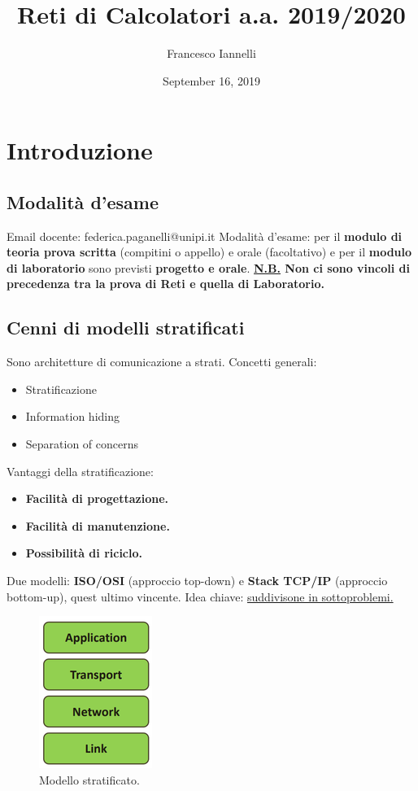 \documentclass[11pt,a4paper,oneside]{book}
\theoremstyle{definition}
\begin{document}
\title{Reti di Calcolatori a.a. 2019/2020}
\author{Francesco Iannelli}
\date{September 16, 2019}
\maketitle

\setcounter{tocdepth}{5}
\tableofcontents

\pagebreak

\chapter{Introduzione}
\section{Modalità d'esame}
Email docente: federica.paganelli@unipi.it\newline
Modalità d'esame: per il \textbf{modulo di teoria prova scritta} (compitini o appello) e orale (facoltativo) e per il \textbf{modulo di laboratorio} sono previsti \textbf{progetto e orale}. \newline
\textbf{\underline{N.B.} Non ci sono vincoli di precedenza tra la prova di Reti e quella di Laboratorio.}

\section{Cenni di modelli stratificati}
Sono architetture di comunicazione a strati. \newline
Concetti generali:
\begin{itemize}
	\item Stratificazione
	\item Information hiding
	\item Separation of concerns
\end{itemize}
Vantaggi della stratificazione:
\begin{itemize}
	\item \textbf{Facilità di progettazione.}
	\item \textbf{Facilità di manutenzione.}
	\item \textbf{Possibilità di riciclo.}
\end{itemize}
Due modelli: \textbf{ISO/OSI} (approccio top-down) e \textbf{Stack TCP/IP} (approccio bottom-up), quest ultimo vincente.\newline
Idea chiave: \underline{suddivisone in sottoproblemi.}
\begin{figure}[!h]
	\includegraphics[scale=0.8]{Immagini/Modelli_Strat.png}
	\centering
	\caption{Modello stratificato.}
\end{figure}
\end{document}
